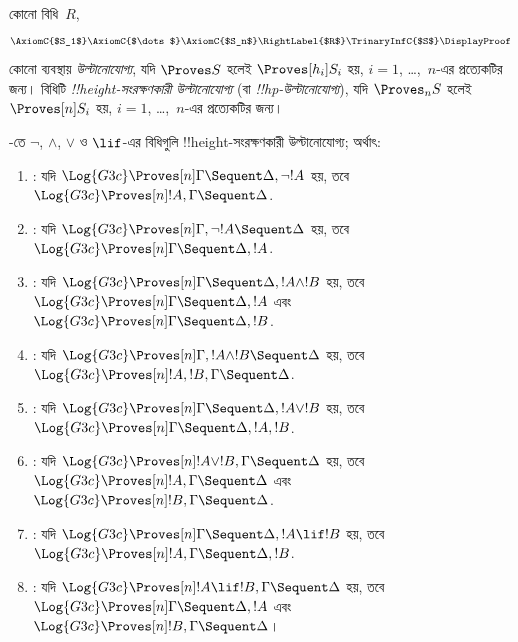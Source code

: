 \documentclass[../../../include/open-logic-section]{subfiles}
\begin{document}


\begin{defn}
কোনো বিধি~$R$,
\[
\AxiomC{$S_1$}
\AxiomC{$\dots$}
\AxiomC{$S_n$}
\RightLabel{$R$}
\TrinaryInfC{$S$}
\DisplayProof
\]
কোনো ব্যবস্থায় \emph{উল্টানোযোগ্য}, যদি
$\Proves S$ হলেই $\Proves[h_i] S_i$ হয়,
$i = 1$, \dots,~$n$-এর প্রত্যেকটির
জন্য। বিধিটি \emph{!!{height}-সংরক্ষণকারী
উল্টানোযোগ্য} (বা \emph{!!{hp}-উল্টানোযোগ্য}),
যদি $\Proves_n S$ হলেই
$\Proves[n] S_i$ হয়,
$i = 1$, \dots,~$n$-এর প্রত্যেকটির
জন্য।
\end{defn}

\begin{lem}
-তে $\lnot$, $\land$, $\lor$
ও $\lif$-এর বিধিগুলি
!!{height}-সংরক্ষণকারী উল্টানোযোগ্য;
অর্থাৎ:
\begin{enumerate}
  \item \RightR{\lnot}: যদি $\Log{G3c} \Proves[n] \Gamma \Sequent
  \Delta, \lnot !A$ হয়, তবে $\Log{G3c} \Proves[n] !A, \Gamma \Sequent
  \Delta$.
  \item \LeftR{\lnot}: যদি $\Log{G3c} \Proves[n] \Gamma, \lnot !A
  \Sequent \Delta$ হয়, তবে $\Log{G3c} \Proves[n] \Gamma \Sequent \Delta,
  !A$.
  \item \RightR{\land}: যদি $\Log{G3c} \Proves[n] \Gamma \Sequent
  \Delta, !A \land !B$ হয়, তবে $\Log{G3c} \Proves[n] \Gamma \Sequent
  \Delta, !A$ এবং $\Log{G3c} \Proves[n] \Gamma \Sequent
  \Delta, !B$.
  \item \LeftR{\land}: যদি $\Log{G3c} \Proves[n] \Gamma, !A \land !B
  \Sequent \Delta$ হয়, তবে $\Log{G3c} \Proves[n] !A, !B, \Gamma \Sequent
  \Delta$.
  \item \RightR{\lor}: যদি $\Log{G3c} \Proves[n] \Gamma \Sequent
  \Delta, !A \lor !B$ হয়, তবে $\Log{G3c} \Proves[n] \Gamma \Sequent
  \Delta, !A, !B$.
  \item \LeftR{\lor}: যদি $\Log{G3c} \Proves[n] !A \lor !B, \Gamma \Sequent
  \Delta$ হয়, তবে $\Log{G3c} \Proves[n] !A, \Gamma \Sequent
  \Delta$ এবং $\Log{G3c} \Proves[n] !B, \Gamma \Sequent
  \Delta$.
  \item \RightR{\lif}: যদি $\Log{G3c} \Proves[n] \Gamma \Sequent
  \Delta, !A \lif !B$ হয়, তবে $\Log{G3c} \Proves[n] !A, \Gamma \Sequent
  \Delta, !B$.
  \item \LeftR{\lif}: যদি $\Log{G3c} \Proves[n] !A \lif !B, \Gamma
  \Sequent \Delta$ হয়, তবে $\Log{G3c} \Proves[n] \Gamma \Sequent \Delta,
  !A$ এবং $\Log{G3c} \Proves[n] !B, \Gamma \Sequent \Delta$।
\end{enumerate}
\end{lem}
\end{document}
